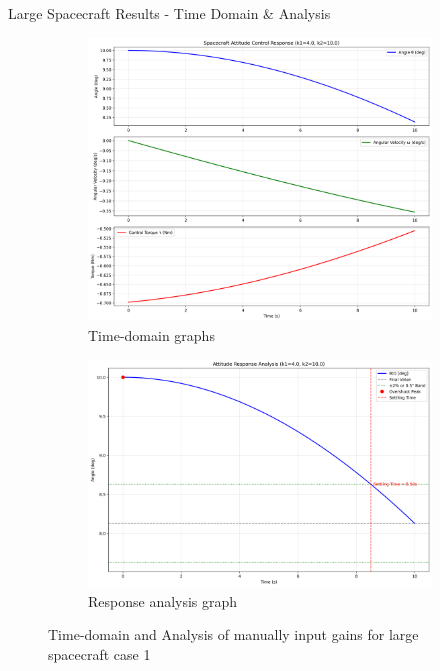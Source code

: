 \documentclass{beamer}
\begin{document}
\begin{frame}{Large Spacecraft Results - Time Domain \& Analysis}
    \begin{figure}[H]
    \label{Fig. 1}
    \centering
    \begin{subfigure}[b]{0.48\columnwidth}
        \label{Fig. 1.A}
        \centering
        \includegraphics[width=\linewidth]{base_time_domain(1).pdf}
        \caption{Time-domain graphs}
        \label{fig:subfig1}
    \end{subfigure}
    \hfill
    \begin{subfigure}[b]{0.48\columnwidth}
        \label{Fig. 1.B}
        \centering
        \includegraphics[width=\linewidth]{base_analysis(1).pdf}
        \caption{Response analysis graph}
        \label{fig:subfig2}
    \end{subfigure}
    \caption{Time-domain and Analysis of manually input gains for large spacecraft case 1}
    \label{fig:combined}
\end{figure}
\end{frame}
\end{document}
